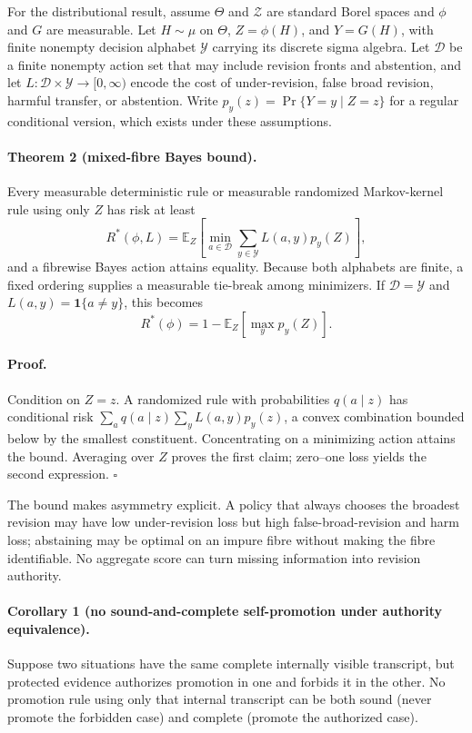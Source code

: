 For the distributional result, assume $\Theta$ and $\mathcal Z$ are standard
Borel spaces and $\phi$ and $G$ are measurable. Let $H\sim\mu$ on $\Theta$,
$Z=\phi(H)$, and $Y=G(H)$, with finite nonempty decision alphabet $\mathcal Y$
carrying its discrete sigma algebra. Let
$\mathcal D$ be a finite nonempty action set that may include revision fronts and
abstention, and let
$L:\mathcal D\times\mathcal Y\to[0,\infty)$ encode the cost of under-revision,
false broad revision, harmful transfer, or abstention. Write
$p_y(z)=\Pr\{Y=y\mid Z=z\}$ for a regular conditional version, which exists
under these assumptions.

\paragraph{Theorem 2 (mixed-fibre Bayes bound).}
Every measurable deterministic rule or measurable randomized Markov-kernel
rule using only $Z$ has risk at least
\[
  R^*(\phi,L)=
  \mathbb E_Z\!\left[
    \min_{a\in\mathcal D}\sum_{y\in\mathcal Y}L(a,y)p_y(Z)
  \right],
\]
and a fibrewise Bayes action attains equality.  Because both alphabets are
finite, a fixed ordering supplies a measurable tie-break among minimizers. If
$\mathcal D=\mathcal Y$ and $L(a,y)=\mathbf 1\{a\ne y\}$, this becomes
\[
  R^*(\phi)=1-\mathbb E_Z\!\left[\max_y p_y(Z)\right].
\]

\paragraph{Proof.}
Condition on $Z=z$. A randomized rule with probabilities $q(a\mid z)$ has
conditional risk
$\sum_a q(a\mid z)\sum_y L(a,y)p_y(z)$, a convex combination bounded below by
the smallest constituent. Concentrating on a minimizing action attains the
bound. Averaging over $Z$ proves the first claim; zero--one loss yields the
second expression. \hfill$\square$

The bound makes asymmetry explicit. A policy that always chooses the broadest
revision may have low under-revision loss but high false-broad-revision and harm
loss; abstaining may be optimal on an impure fibre without making the fibre
identifiable. No aggregate score can turn missing information into revision
authority.

\paragraph{Corollary 1 (no sound-and-complete self-promotion under authority
equivalence).}
Suppose two situations have the same complete internally visible transcript,
but protected evidence authorizes promotion in one and forbids it in the
other. No promotion rule using only that internal transcript can be both sound
(never promote the forbidden case) and complete (promote the authorized case).

